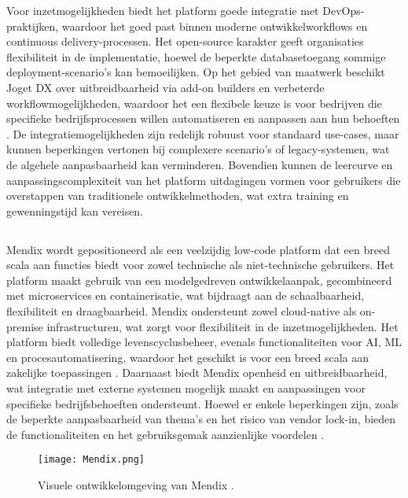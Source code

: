 Voor inzetmogelijkheden biedt het platform goede integratie met DevOps-praktijken, waardoor het goed past binnen moderne ontwikkelworkflows en continuous delivery-processen. Het open-source karakter geeft organisaties flexibiliteit in de implementatie, hoewel de beperkte databasetoegang sommige deployment-scenario's kan bemoeilijken. Op het gebied van maatwerk beschikt Joget DX over uitbreidbaarheid via add-on builders en verbeterde workflowmogelijkheden, waardoor het een flexibele keuze is voor bedrijven die specifieke bedrijfsprocessen willen automatiseren en aanpassen aan hun behoeften \autocite{Sido2024}. De integratiemogelijkheden zijn redelijk robuust voor standaard use-cases, maar kunnen beperkingen vertonen bij complexere scenario's of legacy-systemen, wat de algehele aanpasbaarheid kan verminderen. Bovendien kunnen de leercurve en aanpassingscomplexiteit van het platform uitdagingen vormen voor gebruikers die overstappen van traditionele ontwikkelmethoden, wat extra training en gewenningstijd kan vereisen.
\subsection{}
Mendix wordt gepositioneerd als een veelzijdig low-code platform dat een breed scala aan functies biedt voor zowel technische als niet-technische gebruikers. Het platform maakt gebruik van een modelgedreven ontwikkelaanpak, gecombineerd met microservices en containerisatie, wat bijdraagt aan de schaalbaarheid, flexibiliteit en draagbaarheid. Mendix ondersteunt zowel cloud-native als on-premise infrastructuren, wat zorgt voor flexibiliteit in de inzetmogelijkheden. Het platform biedt volledige levenscyclusbeheer, evenals functionaliteiten voor \gls{AI}, \gls{ML} en procesautomatisering, waardoor het geschikt is voor een breed scala aan zakelijke toepassingen \autocite{Sido2024}. Daarnaast biedt Mendix openheid en uitbreidbaarheid, wat integratie met externe systemen mogelijk maakt en aanpassingen voor specifieke bedrijfsbehoeften ondersteunt. Hoewel er enkele beperkingen zijn, zoals de beperkte aanpasbaarheid van thema's en het risico van vendor lock-in, bieden de functionaliteiten en het gebruiksgemak aanzienlijke voordelen \autocite{Sido2024}.

\begin{figure}[H]
    \centering
    \texttt{[image: Mendix.png]}
    \caption[Visuele ontwikkelomgeving Mendix]{\label{fig:Mendix} Visuele ontwikkelomgeving van Mendix \autocite{Mendix2025}.}
\end{figure}

